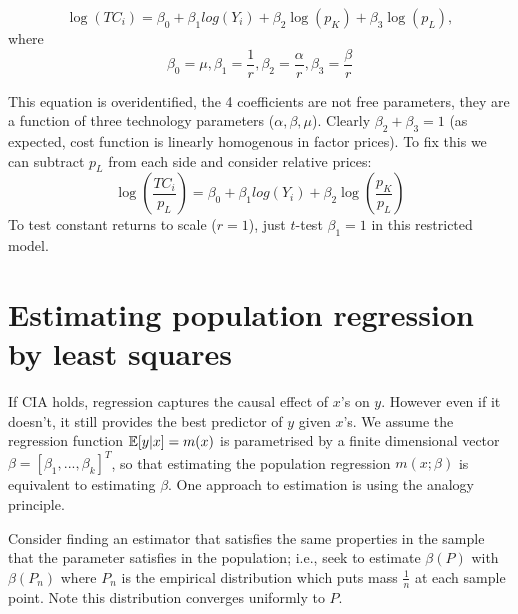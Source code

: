 \documentclass[DIV=14,titlepage=false]{scrreprt}
\begin{document}
\begin{example}
\[ \log(TC_i)=\beta_0 + \beta_1 log(Y_i)+\beta_2 \log(p_K)+\beta_3\log(p_L),\] where
\[\beta_0 = \mu, \beta_1 = \frac{1}{r}, \beta_2 = \frac{\alpha}{r}, \beta_3 = \frac{\beta}{r}\]

This equation is overidentified, the 4 coefficients are not free parameters, they are a function of three technology parameters ($\alpha,\beta,\mu$). Clearly $\beta_2+\beta_3=1$ (as expected, cost function is linearly homogenous in factor prices). To fix this we can subtract $p_L$ from each side and consider relative prices: 
\[\log\left(\frac{TC_i}{p_L}\right)=\beta_0 + \beta_1 log(Y_i)+\beta_2 \log\left(\frac{p_K}{p_L}\right) \]
To test constant returns to scale ($r=1$), just $t$-test $\beta_1 = 1$ in this restricted model.
\end{example}

\section{Estimating population regression by least squares}
If CIA holds, regression captures the causal effect of $x$'s on $y$. However even if it doesn't, it still provides the best predictor of $y$ given $x$'s. We assume the regression function $\mathbb{E}[y|x]=m(x)$ is parametrised by a finite dimensional vector $\beta = [\beta_1, ..., \beta_k]^{T}$, so that estimating the population regression $m(x;\beta)$ is equivalent to estimating $\beta$. One approach to estimation is using the analogy principle.

\begin{definition}
    Consider finding an estimator that satisfies the same properties in the sample that the parameter satisfies in the population; i.e., seek to estimate $ \beta(P) $ with $ \beta(P_n) $ where $ P_n $ is the empirical distribution which puts mass $ \tfrac{1}{n} $ at each sample point. Note this distribution converges uniformly to $ P $.
\end{definition}
\end{document}
